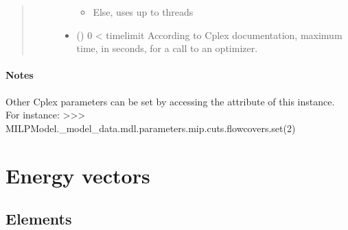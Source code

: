 \documentclass[letterpaper,10pt,english]{sphinxmanual}
\begin{document}
\begin{fulllineitems}
\begin{fulllineitems}
\begin{quote}
\begin{description}
\begin{itemize}
\begin{itemize}
\item {} 
\sphinxAtStartPar
Else, uses up to  threads

\end{itemize}


\item {} 
\sphinxAtStartPar
{} (\sphinxstyleliteralemphasis{\sphinxupquote{, }}\sphinxstyleliteralemphasis{\sphinxupquote{, }}) \textendash{} 0 \textless{} timelimit
According to Cplex documentation, maximum time, in seconds, for a call to an optimizer.

\end{itemize}

\end{description}\end{quote}
\subsubsection*{Notes}

\sphinxAtStartPar
Other Cplex parameters can be set by accessing the attribute  of this  instance.
For instance:
\textgreater{}\textgreater{}\textgreater{} MILPModel.\_model\_data.mdl.parameters.mip.cuts.flowcovers.set(2)

\end{fulllineitems}


\end{fulllineitems}


\sphinxstepscope


\chapter{Energy vectors}
\label{\detokenize{element:energy-vectors}}\label{\detokenize{element::doc}}

\section{Elements}
\label{\detokenize{element:elements}}
\end{document}

